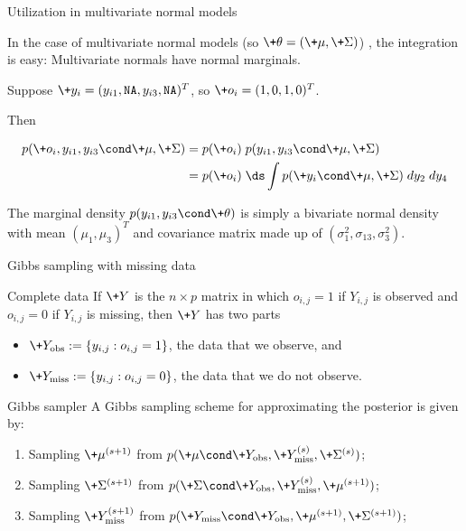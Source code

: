 \documentclass[10pt]{beamer}
\begin{document}
\begin{frame}{Utilization in multivariate normal models}


In the case of multivariate normal models \footnotesize (so $\+\theta = (\+\mu, \+\Sigma)$) \normalsize, the integration is easy:  Multivariate normals have normal marginals. 

\vfill \vfill \vfill 
\begin{example}
Suppose $\+y_i = (y_{i1},  \texttt{NA},  y_{i3},  \texttt{NA})^T$, so $\+o_i = (1,0,1,0)^T$.     

Then

\begin{align*}
p(\+o_i,  y_{i1},  y_{i3} \cond \+\mu, \+\Sigma) & = p(\+o_i) \;  p(y_{i1},  y_{i3} \cond \+\mu, \+\Sigma) \\
&=  p(\+o_i) \;  \ds\int p( \+y_i  \cond \+\mu, \+\Sigma)  \; dy_2 \; dy_4
\end{align*}
\vfill 

The marginal density $p(y_{i1},  y_{i3} \cond \+\theta)$ is simply a bivariate normal density with mean $(\mu_1,  \mu_3)^T$ and covariance matrix made up of $(\sigma^2_1,  \sigma_{13},  \sigma^2_3)$.
\end{example}

\end{frame}

\begin{frame}{Gibbs sampling with missing data}

\begin{sblock}{Complete data}
If $\+Y$ is the $n \times p$ matrix in which $o_{i,j}=1$ if $Y_{i,j}$ is observed and $o_{i,j} = 0$ if $Y_{i,j}$ is missing, then $\+Y$ has two parts

\begin{itemize}
\item $\+Y_{\text{obs}} := \{y_{i,j} : o_{i,j} =1 \}$, the data that we observe, and 
\item 	$\+Y_{\text{miss}} := \{y_{i,j} : o_{i,j} =0 \}$, the data that we do not observe.
\end{itemize}
\end{sblock}

\begin{sblock}{Gibbs sampler}
A Gibbs sampling scheme for approximating the posterior is given by:

\begin{enumerate}
\item Sampling $\+\mu^{(s+1)}$ from $p(\+\mu \cond \+Y_{\text{obs}}, \+Y_{\text{miss}}^{(s)}, \+\Sigma^{(s)})$;
\item Sampling $\+\Sigma^{(s+1)}$ from $p(\+\Sigma \cond \+Y_\text{obs}, \+Y_\text{miss}^{(s)}, \+\mu^{(s+1)})$;
\item Sampling $\+Y_\text{miss}^{(s+1)}$ from $p(\+Y_\text{miss} \cond \+Y_\text{obs}, \+\mu^{(s+1)}, \+\Sigma^{(s+1)})$;
\end{enumerate}
\end{sblock}

\pause
{}

\end{frame}
\end{document}

